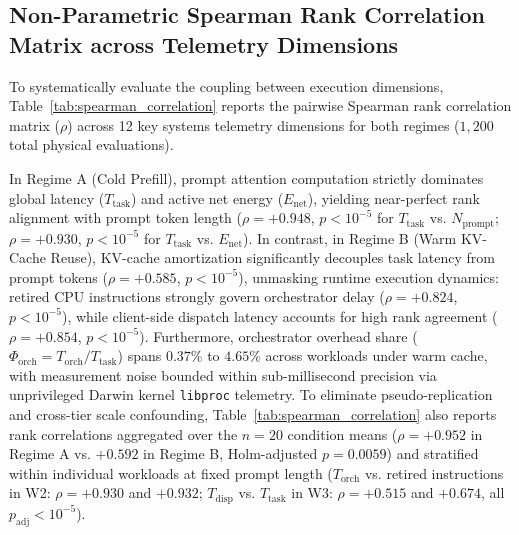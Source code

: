 \documentclass[preprint,12pt,3p]{elsarticle}
\begin{document}
\subsection{Non-Parametric Spearman Rank Correlation Matrix across Telemetry Dimensions}
To systematically evaluate the coupling between execution dimensions, Table~\ref{tab:spearman_correlation} reports the pairwise Spearman rank correlation matrix ($\rho$) across 12 key systems telemetry dimensions for both regimes ($1{,}200$ total physical evaluations).



In Regime A (Cold Prefill), prompt attention computation strictly dominates global latency ($T_{\text{task}}$) and active net energy ($E_{\text{net}}$), yielding near-perfect rank alignment with prompt token length ($\rho = +0.948$, $p < 10^{-5}$ for $T_{\text{task}}$ vs. $N_{\text{prompt}}$; $\rho = +0.930$, $p < 10^{-5}$ for $T_{\text{task}}$ vs. $E_{\text{net}}$). In contrast, in Regime B (Warm KV-Cache Reuse), KV-cache amortization significantly decouples task latency from prompt tokens ($\rho = +0.585$, $p < 10^{-5}$), unmasking runtime execution dynamics: retired CPU instructions strongly govern orchestrator delay ($\rho = +0.824$, $p < 10^{-5}$), while client-side dispatch latency accounts for high rank agreement ($\rho = +0.854$, $p < 10^{-5}$). Furthermore, orchestrator overhead share ($\Phi_{\text{orch}} = T_{\text{orch}} / T_{\text{task}}$) spans $0.37\%$ to $4.65\%$ across workloads under warm cache, with measurement noise bounded within sub-millisecond precision via unprivileged Darwin kernel \texttt{libproc} telemetry. To eliminate pseudo-replication and cross-tier scale confounding, Table~\ref{tab:spearman_correlation} also reports rank correlations aggregated over the $n=20$ condition means ($\rho = +0.952$ in Regime A vs. $+0.592$ in Regime B, Holm-adjusted $p = 0.0059$) and stratified within individual workloads at fixed prompt length ($T_{\text{orch}}$ vs. retired instructions in W2: $\rho = +0.930$ and $+0.932$; $T_{\text{disp}}$ vs. $T_{\text{task}}$ in W3: $\rho = +0.515$ and $+0.674$, all $p_{\text{adj}} < 10^{-5}$).
\end{document}
